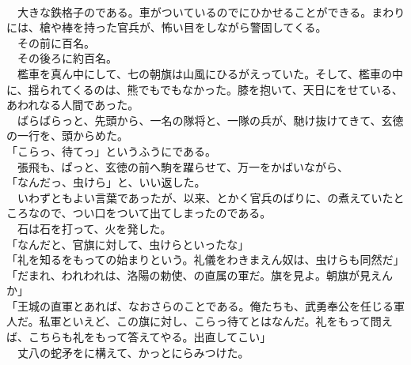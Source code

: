 \documentclass[
  paper=a5,
  fontsize=10pt,
  jafontsize=9.5pt,
  tate,                  %
  open_bracket_pos=nibu, %
]{jlreq}
\begin{document}
\\


　大きな鉄格子のである。車がついているのでにひかせることができる。まわりには、槍や棒を持った官兵が、怖い目をしながら警固してくる。\\


　その前に百名。\\


　その後ろに約百名。\\


　檻車を真ん中にして、七の朝旗は山風にひるがえっていた。そして、檻車の中に、揺られてくるのは、熊でもでもなかった。膝を抱いて、天日にをせている、あわれなる人間であった。\\


　ばらばらっと、先頭から、一名の隊将と、一隊の兵が、馳け抜けてきて、玄徳の一行を、頭からめた。\\


「こらっ、待てっ」というふうにである。\\


　張飛も、ぱっと、玄徳の前へ駒を躍らせて、万一をかばいながら、\\


「なんだっ、虫けら」と、いい返した。\\


　いわずともよい言葉であったが、以来、とかく官兵のばりに、の煮えていたところなので、つい口をついて出てしまったのである。\\


　石は石を打って、火を発した。\\


「なんだと、官旗に対して、虫けらといったな」\\


「礼を知るをもっての始まりという。礼儀をわきまえん奴は、虫けらも同然だ」\\


「だまれ、われわれは、洛陽の勅使、の直属の軍だ。旗を見よ。朝旗が見えんか」\\


「王城の直軍とあれば、なおさらのことである。俺たちも、武勇奉公を任じる軍人だ。私軍といえど、この旗に対し、こらっ待てとはなんだ。礼をもって問えば、こちらも礼をもって答えてやる。出直してこい」\\


　丈八の蛇矛をに構えて、かっとにらみつけた。\\
\end{document}
